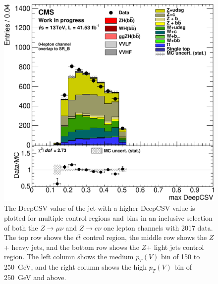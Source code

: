 \begin{figure}
  \includegraphics[width=0.42\linewidth]{figures/2017_Znn/Zlf_high_Znn__Hj0_DeepCSV_.pdf}
  \caption[Control region plots for zero lepton in 2017]{
    The DeepCSV value of the jet with a higher DeepCSV value
    is plotted for multiple control regions and bins in
    an inclusive selection of both the $Z\rightarrow \mu\nu$ and
    $Z\rightarrow e\nu$ 
    one lepton channels with 2017 data.
    The top row shows the $t\bar{t}$ control region,
    the middle row shows the $Z$+ heavy jets,
    and the bottom row shows the $Z$+ light jets control region.
    The left column shows the medium $p_T(V)$ bin of 150 to \SI{250}{GeV},
    and the right column shows the high $p_T(V)$ bin of \SI{250}{GeV} and above.
  }
  \label{fig:2017_Znn_j0csv}
\end{figure}

